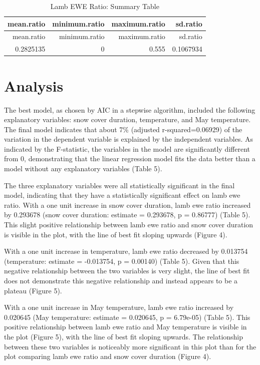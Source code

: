 \documentclass[
  12pt,
]{article}
\begin{document}
\begin{longtable}[]{@{}rrrr@{}}
\caption{Lamb EWE Ratio: Summary Table}\tabularnewline
\toprule
mean.ratio & minimum.ratio & maximum.ratio & sd.ratio \\
\midrule
\endfirsthead
\toprule
mean.ratio & minimum.ratio & maximum.ratio & sd.ratio \\
\midrule
\endhead
0.2825135 & 0 & 0.555 & 0.1067934 \\
\bottomrule
\end{longtable}

\newpage

\hypertarget{analysis}{%
\section{Analysis}\label{analysis}}

The best model, as chosen by AIC in a stepwise algorithm, included the
following explanatory variables: snow cover duration, temperature, and
May temperature. The final model indicates that about 7\% (adjusted
r-squared=0.06929) of the variation in the dependent variable is
explained by the independent variables. As indicated by the F-statistic,
the variables in the model are significantly different from 0,
demonstrating that the linear regression model fits the data better than
a model without any explanatory variables (Table 5).

The three explanatory variables were all statistically significant in
the final model, indicating that they have a statistically significant
effect on lamb ewe ratio. With a one unit increase in snow cover
duration, lamb ewe ratio increased by 0.293678 (snow cover duration:
estimate = 0.293678, p = 0.86777) (Table 5). This slight positive
relationship between lamb ewe ratio and snow cover duration is visible
in the plot, with the line of best fit sloping upwards (Figure 4).

With a one unit increase in temperature, lamb ewe ratio decreased by
0.013754 (temperature: estimate = -0.013754, p = 0.00140) (Table 5).
Given that this negative relationship between the two variables is very
slight, the line of best fit does not demonstrate this negative
relationship and instead appears to be a plateau (Figure 5).

With a one unit increase in May temperature, lamb ewe ratio increased by
0.020645 (May temperature: estimate = 0.020645, p = 6.79e-05) (Table 5).
This positive relationship between lamb ewe ratio and May temperature is
visible in the plot (Figure 5), with the line of best fit sloping
upwards. The relationship between these two variables is noticeably more
significant in this plot than for the plot comparing lamb ewe ratio and
snow cover duration (Figure 4).
\end{document}
